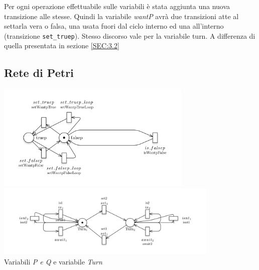 \documentclass[a4paper]{article}
\begin{document}
Per ogni operazione effettuabile sulle variabili è stata aggiunta una nuova transizione alle stesse.
Quindi la variabile \textit{wantP} avrà due transizioni atte al settarla vera o falsa, una usata fuori dal ciclo interno ed una all'interno (transizione \texttt{set\_truep}).
Stesso discorso vale per la variabile turn. A differenza di quella presentata in sezione \ref{SEC:3.2}
\subsection{Rete di Petri}
\begin{center}
\includegraphics[width=0.7\textwidth]{WantP.png}
\includegraphics[width=0.8\textwidth]{turn.png}\\
Variabili \textit{P \textit{e} Q} e variabile \textit{Turn}
\end{center}
\end{document}
